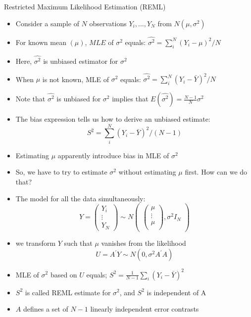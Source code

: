\documentclass{beamer}
\begin{document}
\begin{frame}{Restricted Maximum Likelihood Estimation (REML)}
{\color{blue}{Variance Estimation in Normal Populations}}
\begin{itemize}
\item Consider a sample of $N$ observations $Y_i,\dots, Y_N$ from $N(\mu,\sigma^2)$ \vspace{0.25cm}
\item For known mean $(\mu)$, $ MLE$ of $\sigma^2$ equals: $\hat{\sigma^{2}}=\sum_{i}^{N}(Y_i-\mu)^{2}/N$ \vspace{0.25cm}
\item Here, $\hat{\sigma^{2}}$ is unbiased estimator for $\sigma^2$ \vspace{0.25cm}
\item When $\mu$ is not known, MLE of $\sigma^2$ equals: $\hat{\sigma^{2}}=\sum_{i}^{N}(Y_i-\bar{Y})^{2}/N$ \vspace{0.25cm}
\item Note that $\hat{\sigma^{2}}$ is unbiased for $\sigma^2$ implies that $E(\hat{\sigma^{2}})=\frac{N-1}{N}\sigma^2$
\item The bias expression tells us how to derive an unbiased estimate:
\[S^2=\sum_{i}^{N}(Y_i-\bar{Y})^{2}/(N-1)\] 
\item Estimating $\mu$ apparently introduce bias in MLE of $\sigma^2$
\end{itemize}
\end{frame}

\begin{frame}
\begin{itemize}
	\item So, we have to try to estimate $\sigma^2$ without estimating $\mu$ first. How can we do that?
	\item The model for all the data simultaneously:
\[Y=
\begin{pmatrix}
Y_i\\
\vdots\\
Y_N
\end{pmatrix}
\sim N
\begin{pmatrix}
\begin{pmatrix}
\mu\\
\vdots\\
\mu\\
\end{pmatrix}, \sigma^2I_N

\end{pmatrix} 
\]
\item we transform $Y$ such that $\mu$ vanishes from the likelihood
\[U=A^{'}Y\sim N(0,\sigma^{2}A^{'}A)
\]
\item MLE of $\sigma^2$ based on $U$ equals; $S^{2}=\frac{1}{N-1}\sum_{i}(Y_i-\bar{Y})^2$
\item $S^2$ is called REML estimate for $\sigma^2$, and $S^2$ is independent of A
\item $A$ defines a set of $N-1$ linearly independent error contrasts
\end{itemize}
\end{frame}
\end{document}
